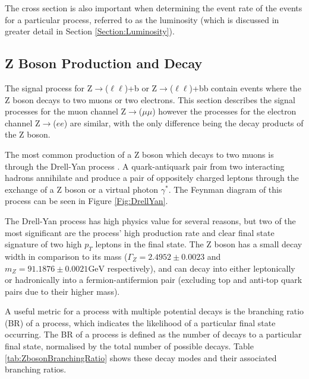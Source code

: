 \documentclass[12pt,a4paper,epsf,portrait,times,epsfig]{report}
\begin{document}
	The cross section is also important when determining the event rate of the events for a particular process, referred to as the luminosity (which is discussed in greater detail in Section \ref{Section:Luminosity}). 


	\newpage
	

	\subsection{Z Boson Production and Decay}
		
		The signal process for Z$\rightarrow$($\ell\ell$)+b or Z$\rightarrow$($\ell\ell$)+bb contain events where the Z boson decays to two muons or two electrons. This section describes the signal processes for the muon channel Z$\rightarrow$($\mu\mu$) however the processes for the electron channel Z$\rightarrow$($ee$) are similar, with the only difference being the decay products of the Z boson. \par
		
		The most common production of a Z boson which decays to two muons is through the Drell-Yan process \cite{Article:DrellYan}. A quark-antiquark pair from two interacting hadrons annihilate and produce a pair of oppositely charged leptons through the exchange of a Z boson or a virtual photon $\gamma^{*}$. The Feynman diagram of this process can be seen in Figure \ref{Fig:DrellYan}. \par
		
		The Drell-Yan process has high physics value for several reasons, but two of the most significant are the process' high production rate and clear final state signature of two high $p_{T}$ leptons in the final state. The Z boson has a small decay width in comparison to its mass ($\Gamma_{Z} = 2.4952 \pm 0.0023$ and $m_{Z} = 91.1876 \pm 0.0021 \textrm{GeV}$ respectively), and can decay into either leptonically or hadronically into a fermion-antifermion pair (excluding top and anti-top quark pairs due to their higher mass). \par
		
		A useful metric for a process with multiple potential decays is the branching ratio (BR) of a process, which indicates the likelihood of a particular final state occurring. The BR of a process is defined as the number of decays to a particular final state, normalised by the total number of possible decays. Table \ref{tab:ZbosonBranchingRatio} shows these decay modes and their associated branching ratios.
		
\end{document}
